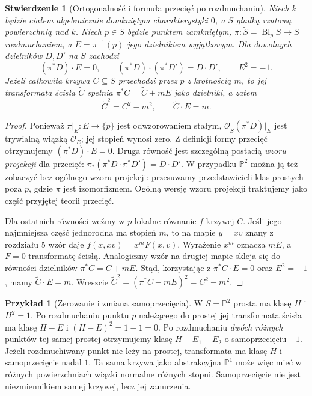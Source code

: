 \documentclass[11pt,a4paper,openany]{report}
\numberwithin{equation}{section}
\theoremstyle{plain}
\newtheorem{stwierdzenie}[twierdzenie]{Stwierdzenie}
\theoremstyle{definition}
\newtheorem{przyklad}[twierdzenie]{Przykład}
\theoremstyle{remark}
\newcommand{\PP}{\mathbb P}
\begin{document}
\begin{stwierdzenie}[Ortogonalność i formuła przecięć po rozdmuchaniu]
\label{st:ga6-blowup-form}
Niech $k$ będzie ciałem algebraicznie domkniętym
charakterystyki $0$, a $S$ gładką rzutową powierzchnią
nad $k$. Niech $p\in S$ będzie punktem zamkniętym,
$\pi:\widetilde S=\operatorname{Bl}_p S\to S$
rozdmuchaniem, a $E=\pi^{-1}(p)$ jego dzielnikiem
wyjątkowym. Dla dowolnych dzielników $D,D'$ na $S$ zachodzi
\[
 (\pi^*D)\cdot E=0,\qquad
 (\pi^*D)\cdot(\pi^*D')=D\cdot D',\qquad E^2=-1.
\]
Jeżeli całkowita krzywa $C\subseteq S$ przechodzi
przez $p$ z krotnością $m$, to jej transformata ścisła
$\widetilde C$ spełnia
$\pi^*C=\widetilde C+mE$ jako dzielniki, a zatem
\[
 \widetilde C^2=C^2-m^2,\qquad
 \widetilde C\cdot E=m.
\]
\end{stwierdzenie}
\begin{proof}
Ponieważ $\pi|_E:E\to\{p\}$ jest odwzorowaniem stałym,
$\mathcal O_{\widetilde S}(\pi^*D)|_E$
jest trywialną wiązką $\mathcal O_E$;
jej stopień wynosi zero. Z definicji formy przecięć
otrzymujemy $(\pi^*D)\cdot E=0$.
Druga równość jest szczególną postacią \emph{wzoru projekcji}
dla przecięć: $\pi_*(\pi^*D\cdot\pi^*D')=D\cdot D'$.
W przypadku $\PP^2$ można ją też zobaczyć bez ogólnego
wzoru projekcji: przesuwamy przedstawicieli klas
prostych poza $p$, gdzie $\pi$ jest izomorfizmem.
Ogólną wersję wzoru projekcji traktujemy jako część
przyjętej teorii przecięć.

Dla ostatnich równości weźmy w $p$ lokalne równanie
$f$ krzywej $C$. Jeśli jego najmniejsza część
jednorodna ma stopień $m$, to na mapie $y=xv$
znany z rozdziału 5 wzór daje
$f(x,xv)=x^mF(x,v)$. Wyrażenie $x^m$ oznacza $mE$,
a $F=0$ transformatę ścisłą. Analogiczny wzór na drugiej
mapie skleja się do równości dzielników
$\pi^*C=\widetilde C+mE$. Stąd, korzystając z
$\pi^*C\cdot E=0$ oraz $E^2=-1$, mamy
$\widetilde C\cdot E=m$. Wreszcie
$\widetilde C^2=(\pi^*C-mE)^2=C^2-m^2$.
\end{proof}

\begin{przyklad}[Zerowanie i zmiana samoprzecięcia]
\label{prz:ga6-blowup-curves}
W $S=\PP^2$ prosta ma klasę $H$ i $H^2=1$.
Po rozdmuchaniu punktu $p$ należącego do prostej
jej transformata ścisła ma klasę $H-E$ i
$(H-E)^2=1-1=0$. Po rozdmuchaniu \emph{dwóch różnych}
punktów tej samej prostej otrzymujemy klasę
$H-E_1-E_2$ o samoprzecięciu $-1$.
Jeżeli rozdmuchiwany punkt nie leży na prostej,
transformata ma klasę $H$ i samoprzecięcie nadal $1$.
Ta sama krzywa jako abstrakcyjna $\PP^1$ może więc
mieć w różnych powierzchniach wiązki normalne
różnych stopni. Samoprzecięcie nie jest niezmiennikiem
samej krzywej, lecz jej zanurzenia.
\end{przyklad}
\end{document}
